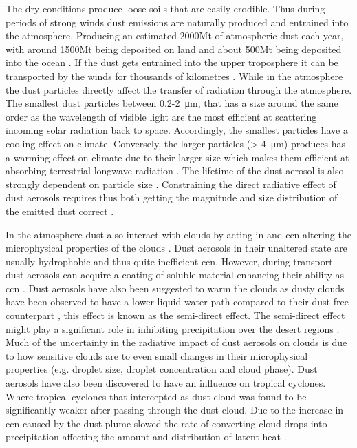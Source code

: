 The dry conditions produce loose soils that are easily erodible. Thus during periods of strong winds dust emissions are naturally produced and entrained into the atmosphere. Producing an estimated 2000Mt of atmospheric dust each year, with around 1500Mt being deposited on land and about 500Mt being deposited into the ocean \parencite{shao2011dust}.  If the dust gets entrained into the upper troposphere it can be transported by the winds for thousands of kilometres \parencite{yumimoto_elevated_2009}. While in the atmosphere the dust particles directly affect the transfer of radiation through the atmosphere. 
The smallest dust particles between 0.2-\SI{2}{\micro\metre}, that has a size around the same order as the wavelength of visible light are the most efficient at scattering incoming solar radiation back to space. Accordingly, the smallest particles have a cooling effect on climate. Conversely, the larger particles (> \SI{4}{\micro\metre}) produces has a warming effect on climate due to their larger size which makes them efficient at absorbing terrestrial longwave radiation \parencite{choobari2014global}.
The lifetime of the dust aerosol is also strongly dependent on particle size \parencite{mahowald2014size}. Constraining the direct radiative effect of dust aerosols requires thus both getting the magnitude and size distribution of the emitted dust correct \parencite{adebiyi2020dust}.

In the atmosphere dust also interact with clouds by acting \acrfull{in} and \acrfull{ccn} altering the microphysical properties of the clouds \parencite{lohmann2006sensitivity}. Dust aerosols in their unaltered state are usually hydrophobic and thus quite inefficient \acrshort{ccn}. However, during transport dust aerosols can acquire a coating of soluble material enhancing their ability as \acrshort{ccn} . Dust aerosols have also been suggested to warm the clouds as dusty clouds have been observed to have a lower liquid water path compared to their dust-free counterpart \parencite{huang2006satellite}, this effect is known as the semi-direct effect. The semi-direct effect might play a significant role in inhibiting precipitation over the desert regions \parencite{shao2011dust}. Much of the uncertainty in the radiative impact of dust aerosols on clouds is due to how sensitive clouds are to even small changes in their microphysical properties (e.g. droplet size, droplet concentration and cloud phase). Dust aerosols have also been discovered to have an influence on tropical cyclones. Where tropical cyclones that intercepted as dust cloud was found to be significantly weaker after passing through the dust cloud. Due to the increase in \acrshort{ccn} caused by the dust plume slowed the rate of converting cloud drops into precipitation affecting the amount and distribution of latent heat \parencite{rosenfeld2011pollution}.  

